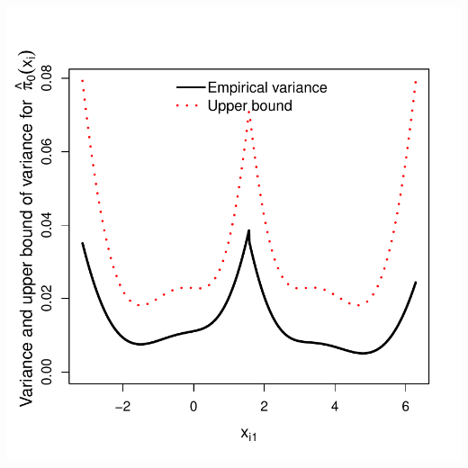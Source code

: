 \documentclass{article}\usepackage[]{graphicx}\usepackage[]{color}
\makeatletter
\def\maxwidth{ %
  \ifdim\Gin@nat@width>\linewidth
    \linewidth
  \else
    \Gin@nat@width
  \fi
}
\newenvironment{knitrout}{}{} %
\makeatother
\begin{document}
\begin{knitrout}
{\centering \includegraphics[width=\maxwidth]{figures/Fig2d-1} 

}



\end{knitrout}
\end{document}
